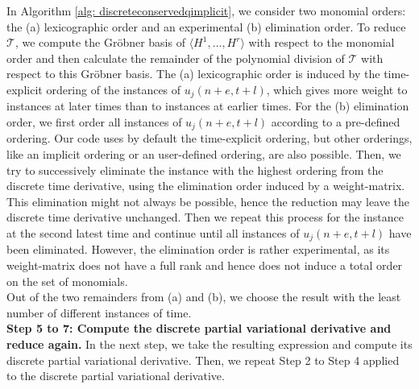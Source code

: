 \documentclass[manuscript]{acmart}
\newcommand{\1}{{\chi}}
\numberwithin{equation}{section}
\theoremstyle{thmlemcorr}
\numberwithin{theorem}{section}
\theoremstyle{thmlemcorr*}
\theoremstyle{defi}
\theoremstyle{remexample}
\theoremstyle{ass}
\begin{document}
	In Algorithm \ref{alg: discreteconservedqimplicit}, we consider two monomial orders: the (a) lexicographic order and an experimental (b) elimination order.
	To reduce $\mathcal{T}$, we compute the Gr{\"o}bner basis of $\langle H^1,\ldots,H^r\rangle$ with respect to the monomial order and then calculate the remainder of the polynomial division of $\mathcal{T}$ with respect to this Gr{\"o}bner basis.
	The (a) lexicographic order is induced by the time-explicit ordering of the instances of $u_j(n+e,t+l)$, which gives more weight to instances at later times than to instances at earlier times.
	For the (b) elimination order, we first order all instances of $u_j(n+e,t+l)$ according to a pre-defined ordering. Our code uses by default the time-explicit ordering, but other orderings, like an implicit ordering or an user-defined ordering, are also possible. Then, we try to successively eliminate the instance with the highest ordering from the discrete time derivative, using the elimination order induced by a weight-matrix.
	This elimination might not always be possible, hence the reduction may leave the discrete time derivative unchanged. Then we repeat this process for the instance at the second latest time and continue until all instances of $u_j(n+e,t+l)$ have been eliminated.
	However, the elimination order is rather experimental, as its weight-matrix does not have a full rank and hence does not induce a total order on the set of monomials.\\
	Out of the two remainders from (a) and (b), we choose the result with the least number of different instances of time.\\
{\bf Step 5 to 7: Compute the discrete partial variational derivative and reduce again.}
	In the next step, we take the resulting expression and compute its discrete partial variational derivative. Then, we repeat Step 2 to Step 4 applied to the discrete partial variational derivative.
\end{document}
